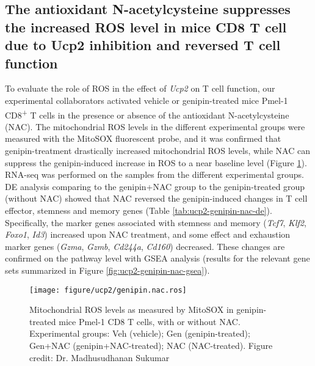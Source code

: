 \documentclass[12pt,twoside,openany,\mydriver]{thesis}  %
\begin{document}
\hypertarget{the-antioxidant-n-acetylcysteine-suppresses-the-increased-ros-level-in-mice-cd8-t-cell-due-to-ucp2-inhibition-and-reversed-t-cell-function}{%
\subsection{The antioxidant N-acetylcysteine suppresses the increased ROS level in mice CD8 T cell due to Ucp2 inhibition and reversed T cell function}\label{the-antioxidant-n-acetylcysteine-suppresses-the-increased-ros-level-in-mice-cd8-t-cell-due-to-ucp2-inhibition-and-reversed-t-cell-function}}

To evaluate the role of ROS in the effect of \emph{Ucp2} on T cell function, our experimental collaborators activated vehicle or genipin-treated mice Pmel-1 CD8\textsuperscript{+} T cells in the presence or absence of the antioxidant N-acetylcysteine (NAC). The mitochondrial ROS levels in the different experimental groups were measured with the MitoSOX fluorescent probe, and it was confirmed that genipin-treatment drastically increased mitochondrial ROS levels, while NAC can suppress the genipin-induced increase in ROS to a near baseline level (Figure \ref{fig:ucp2-genipin-nac-ros}). RNA-seq was performed on the samples from the different experimental groups. DE analysis comparing to the genipin+NAC group to the genipin-treated group (without NAC) showed that NAC reversed the genipin-induced changes in T cell effector, stemness and memory genes (Table \ref{tab:ucp2-genipin-nac-de}). Specifically, the marker genes associated with stemness and memory (\emph{Tcf7}, \emph{Klf2}, \emph{Foxo1}, \emph{Id3}) increased upon NAC treatment, and some effect and exhaustion marker genes (\emph{Gzma}, \emph{Gzmb}, \emph{Cd244a}, \emph{Cd160}) decreased. These changes are confirmed on the pathway level with GSEA analysis (results for the relevant gene sets summarized in Figure \ref{fig:ucp2-genipin-nac-gsea}).
\begin{figure}
\texttt{[image: figure/ucp2/genipin.nac.ros]} \caption{Mitochondrial ROS levels as measured by MitoSOX in genipin-treated mice Pmel-1 CD8 T cells, with or without NAC. Experimental groups: Veh (vehicle); Gen (genipin-treated); Gen+NAC (genipin+NAC-treated); NAC (NAC-treated). Figure credit: Dr. Madhusudhanan Sukumar}\label{fig:ucp2-genipin-nac-ros}
\end{figure}
\end{document}
